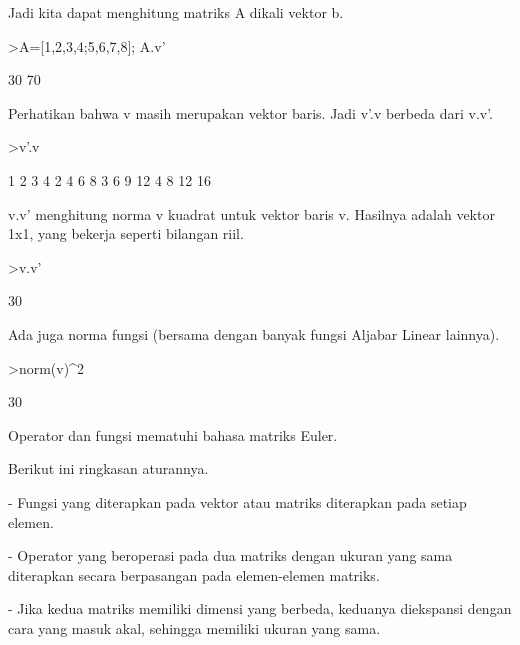 \documentclass[a4paper,10pt]{article}
\begin{document}
\begin{eulernotebook}
\begin{eulercomment}
\begin{eulercomment}
\begin{eulercomment}
\begin{eulercomment}
\begin{eulercomment}
\begin{eulercomment}
\begin{eulercomment}
Jadi kita dapat menghitung matriks A dikali vektor b.
\end{eulercomment}
\begin{eulerprompt}
>A=[1,2,3,4;5,6,7,8]; A.v'
\end{eulerprompt}
\begin{euleroutput}
             30 
             70 
\end{euleroutput}
\begin{eulercomment}
Perhatikan bahwa v masih merupakan vektor baris. Jadi v'.v berbeda
dari v.v'.
\end{eulercomment}
\begin{eulerprompt}
>v'.v
\end{eulerprompt}
\begin{euleroutput}
              1             2             3             4 
              2             4             6             8 
              3             6             9            12 
              4             8            12            16 
\end{euleroutput}
\begin{eulercomment}
v.v' menghitung norma v kuadrat untuk vektor baris v. Hasilnya adalah
vektor 1x1, yang bekerja seperti bilangan riil.
\end{eulercomment}
\begin{eulerprompt}
>v.v'
\end{eulerprompt}
\begin{euleroutput}
  30
\end{euleroutput}
\begin{eulercomment}
Ada juga norma fungsi (bersama dengan banyak fungsi Aljabar Linear
lainnya).
\end{eulercomment}
\begin{eulerprompt}
>norm(v)^2
\end{eulerprompt}
\begin{euleroutput}
  30
\end{euleroutput}
\begin{eulercomment}
Operator dan fungsi mematuhi bahasa matriks Euler.

Berikut ini ringkasan aturannya.

- Fungsi yang diterapkan pada vektor atau matriks diterapkan pada
setiap elemen.

- Operator yang beroperasi pada dua matriks dengan ukuran yang sama
diterapkan secara berpasangan pada elemen-elemen matriks.

- Jika kedua matriks memiliki dimensi yang berbeda, keduanya
diekspansi dengan cara yang masuk akal, sehingga memiliki ukuran yang
sama.


\end{eulercomment}
\end{eulercomment}
\end{eulercomment}
\end{eulercomment}
\end{eulercomment}
\end{eulercomment}
\end{eulercomment}
\end{eulernotebook}
\end{document}
